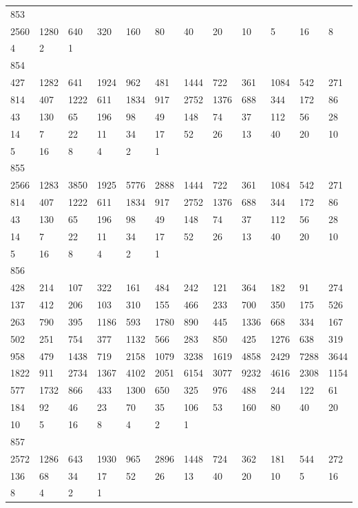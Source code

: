 \begin{longtable}{llllllllllll}
853&&&&&&&&&&&\\
2560& 1280& 640& 320& 160& 80& 40& 20& 10& 5& 16& 8\\
4& 2& 1& \\

854&&&&&&&&&&&\\
427& 1282& 641& 1924& 962& 481& 1444& 722& 361& 1084& 542& 271\\
814& 407& 1222& 611& 1834& 917& 2752& 1376& 688& 344& 172& 86\\
43& 130& 65& 196& 98& 49& 148& 74& 37& 112& 56& 28\\
14& 7& 22& 11& 34& 17& 52& 26& 13& 40& 20& 10\\
5& 16& 8& 4& 2& 1& \\

855&&&&&&&&&&&\\
2566& 1283& 3850& 1925& 5776& 2888& 1444& 722& 361& 1084& 542& 271\\
814& 407& 1222& 611& 1834& 917& 2752& 1376& 688& 344& 172& 86\\
43& 130& 65& 196& 98& 49& 148& 74& 37& 112& 56& 28\\
14& 7& 22& 11& 34& 17& 52& 26& 13& 40& 20& 10\\
5& 16& 8& 4& 2& 1& \\

856&&&&&&&&&&&\\
428& 214& 107& 322& 161& 484& 242& 121& 364& 182& 91& 274\\
137& 412& 206& 103& 310& 155& 466& 233& 700& 350& 175& 526\\
263& 790& 395& 1186& 593& 1780& 890& 445& 1336& 668& 334& 167\\
502& 251& 754& 377& 1132& 566& 283& 850& 425& 1276& 638& 319\\
958& 479& 1438& 719& 2158& 1079& 3238& 1619& 4858& 2429& 7288& 3644\\
1822& 911& 2734& 1367& 4102& 2051& 6154& 3077& 9232& 4616& 2308& 1154\\
577& 1732& 866& 433& 1300& 650& 325& 976& 488& 244& 122& 61\\
184& 92& 46& 23& 70& 35& 106& 53& 160& 80& 40& 20\\
10& 5& 16& 8& 4& 2& 1& \\

857&&&&&&&&&&&\\
2572& 1286& 643& 1930& 965& 2896& 1448& 724& 362& 181& 544& 272\\
136& 68& 34& 17& 52& 26& 13& 40& 20& 10& 5& 16\\
8& 4& 2& 1& \\


\end{longtable}
